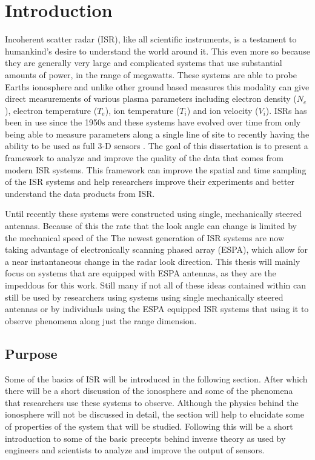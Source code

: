 \chapter{Introduction}
\label{chapter:body}
\thispagestyle{myheadings}
\setcounter{tocdepth}{1}
\graphicspath{{1_Intro/Figures/}}

Incoherent scatter radar (ISR), like all scientific instruments, is a testament to humankind's desire to understand the world around it. This even more so because they are generally very large and complicated systems that use substantial amounts of power, in the range of megawatts. These systems are able to probe Earths ionosphere and unlike other ground based measures this modality can give direct measurements of various plasma parameters including electron density ($N_e$), electron temperature ($T_e$), ion temperature ($T_i$) and ion velocity ($V_i$). ISRs has been in use since the 1950s \cite{gordon58} and these systems have evolved over time from only being able to measure parameters along a single line of site to recently having the ability to be used as full 3-D sensors \cite{Semeter2009738,Nicolls:2007ie}. The goal of this dissertation is to present a framework to analyze and improve the quality of the data that comes from modern ISR systems. This framework can  improve the spatial and time sampling of the ISR systems and help researchers improve their experiments and better understand the data products from ISR.

Until recently these systems were constructed using single, mechanically steered antennas. Because of this the rate that the look angle can change is limited by the mechanical speed of the  The newest generation of ISR systems are now taking advantage of electronically scanning phased array (ESPA), which allow for a near instantaneous change in the radar look direction. This thesis will mainly focus on systems that are equipped with ESPA antennas, as they are the impeddous for this work. Still many if not all of these ideas contained within can still be used by researchers using systems using single mechanically steered antennas or by individuals using the ESPA equipped ISR systems that using it to observe phenomena along just the range dimension.

 
\section{Purpose}
Some of the basics of ISR will be introduced in the following section. After which there will be a short discussion of the ionosphere and some of the phenomena that researchers use these systems to observe. Although the physics behind the ionosphere will not be discussed in detail, the section will help to elucidate some of properties of the system that will be studied. Following this will be a short introduction to some of the basic precepts behind inverse theory as used by engineers and scientists to analyze and improve the output of sensors.

